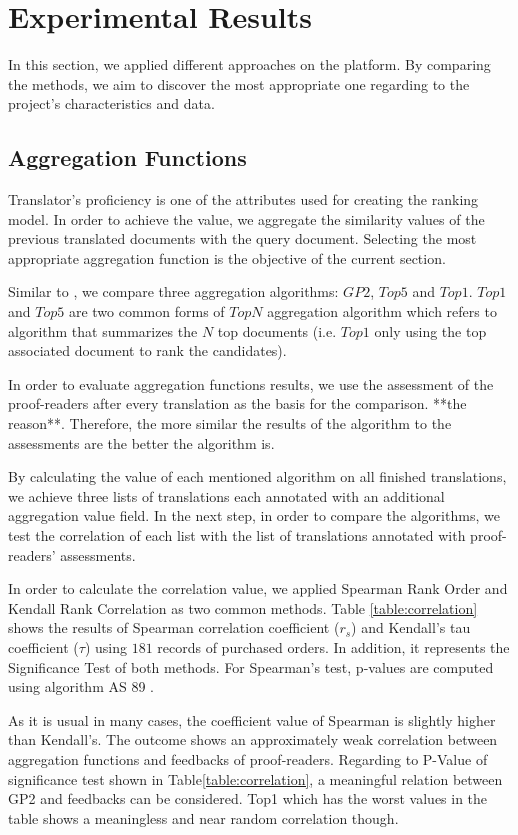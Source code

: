 \section{Experimental Results}
\label{sec:apply}
In this section, we applied different approaches on the platform. By comparing the methods, we aim to discover the most appropriate one regarding to the project's characteristics and data.

\subsection{Aggregation Functions}
Translator's proficiency is one of the attributes used for creating the ranking model. In order to achieve the value, we aggregate the similarity values of the previous translated documents with the query document. Selecting the most appropriate aggregation function is the objective of the current section.

Similar to \cite{agg-gp2}, we compare three aggregation algorithms: $GP2$, $Top5$ and $Top1$. $Top1$ and $Top5$ are two common forms of $TopN$ aggregation algorithm which refers to algorithm that summarizes the $N$ top documents (i.e. $Top1$ only using the top associated document to rank the candidates).

In order to evaluate aggregation functions results, we use the assessment of the proof-readers after every translation as the basis for the comparison. **the reason**. Therefore, the more similar the results of the algorithm to the assessments are the better the algorithm is. 

By calculating the value of each mentioned algorithm on all finished translations, we achieve three lists of translations each annotated with an additional aggregation value field. In the next step, in order to compare the algorithms, we test the correlation of each list with the list of translations annotated with proof-readers' assessments.

In order to calculate the correlation value, we applied Spearman Rank Order and Kendall Rank Correlation as two common methods. Table \ref{table:correlation} shows the results of Spearman correlation coefficient ($r_s$) and Kendall's tau coefficient ($\tau$) using $181$ records of purchased orders. In addition, it represents the Significance Test of both methods. For Spearman's test, p-values are computed using algorithm AS 89 \cite{as89}.

As it is usual in many cases, the coefficient value of Spearman is slightly higher than Kendall's. The outcome shows an approximately weak correlation between aggregation functions and feedbacks of proof-readers. Regarding to P-Value of significance test shown in Table\ref{table:correlation}, a meaningful relation between GP2 and feedbacks can be considered. Top1 which has the worst values in the table shows a meaningless and near random correlation though.

